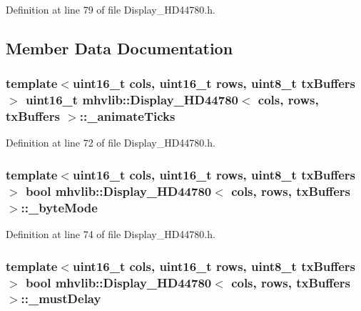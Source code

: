 Definition at line 79 of file Display\-\_\-\-H\-D44780.\-h.



\subsection{Member Data Documentation}
\hypertarget{classmhvlib_1_1_display___h_d44780_a1fc6a61b685899443b518c06ae809f3e}{
\subsubsection[{\-\_\-animate\-Ticks}]{\setlength{\rightskip}{0pt plus 5cm}template$<$uint16\-\_\-t cols, uint16\-\_\-t rows, uint8\-\_\-t tx\-Buffers$>$ uint16\-\_\-t {\bf mhvlib\-::\-Display\-\_\-\-H\-D44780}$<$ cols, rows, tx\-Buffers $>$\-::\-\_\-animate\-Ticks\hspace{0.3cm}{\ttfamily [protected]}}}\label{classmhvlib_1_1_display___h_d44780_a1fc6a61b685899443b518c06ae809f3e}


Definition at line 72 of file Display\-\_\-\-H\-D44780.\-h.

\hypertarget{classmhvlib_1_1_display___h_d44780_ac8a09ff374404a58c3358dec12281014}{
\subsubsection[{\-\_\-byte\-Mode}]{\setlength{\rightskip}{0pt plus 5cm}template$<$uint16\-\_\-t cols, uint16\-\_\-t rows, uint8\-\_\-t tx\-Buffers$>$ bool {\bf mhvlib\-::\-Display\-\_\-\-H\-D44780}$<$ cols, rows, tx\-Buffers $>$\-::\-\_\-byte\-Mode\hspace{0.3cm}{\ttfamily [protected]}}}\label{classmhvlib_1_1_display___h_d44780_ac8a09ff374404a58c3358dec12281014}


Definition at line 74 of file Display\-\_\-\-H\-D44780.\-h.

\hypertarget{classmhvlib_1_1_display___h_d44780_a636ba89b43ae6fe21cdeb0c225d1b6ca}{
\subsubsection[{\-\_\-must\-Delay}]{\setlength{\rightskip}{0pt plus 5cm}template$<$uint16\-\_\-t cols, uint16\-\_\-t rows, uint8\-\_\-t tx\-Buffers$>$ bool {\bf mhvlib\-::\-Display\-\_\-\-H\-D44780}$<$ cols, rows, tx\-Buffers $>$\-::\-\_\-must\-Delay\hspace{0.3cm}{\ttfamily [protected]}}}\label{classmhvlib_1_1_display___h_d44780_a636ba89b43ae6fe21cdeb0c225d1b6ca}


